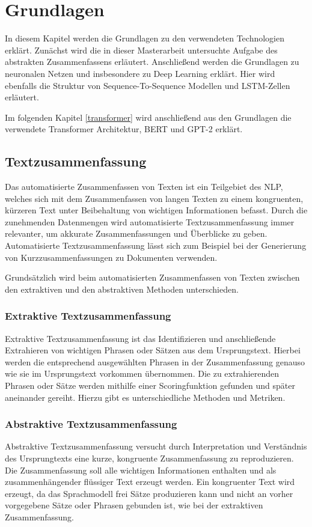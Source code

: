 \section{Grundlagen}\raggedbottom
In diesem Kapitel werden die Grundlagen zu den verwendeten Technologien erklärt. Zunächst wird die in dieser Masterarbeit untersuchte Aufgabe des abstrakten Zusammenfassens erläutert.
Anschließend werden die Grundlagen zu neuronalen Netzen und insbesondere zu Deep Learning erklärt. 
Hier wird ebenfalls die Struktur von Sequence-To-Sequence Modellen und LSTM-Zellen erläutert.

Im folgenden Kapitel \ref*{transformer} wird anschließend aus den Grundlagen die verwendete Transformer Architektur, BERT und GPT-2 erklärt.


\subsection{Textzusammenfassung}
Das automatisierte Zusammenfassen von Texten ist ein Teilgebiet des NLP, welches sich mit dem Zusammenfassen von langen Texten zu einem kongruenten, kürzeren Text unter Beibehaltung von wichtigen Informationen befasst. 
Durch die zunehmenden Datenmengen wird automatisierte Textzusammenfassung immer relevanter, um akkurate Zusammenfassungen und Überblicke zu geben.
Automatisierte Textzusammenfassung lässt sich zum Beispiel bei der Generierung von Kurzzusammenfassungen zu Dokumenten verwenden.

Grundsätzlich wird beim automatisierten Zusammenfassen von Texten zwischen den extraktiven und den abstraktiven Methoden unterschieden.

\subsubsection{Extraktive Textzusammenfassung}
Extraktive Textzusammenfassung ist das Identifizieren und anschließende Extrahieren von wichtigen Phrasen oder Sätzen aus dem Ursprungstext.
Hierbei werden die entsprechend ausgewählten Phrasen in der Zusammenfassung genauso wie sie im Ursprungstext vorkommen übernommen.
Die zu extrahierenden Phrasen oder Sätze werden mithilfe einer Scoringfunktion gefunden und später aneinander gereiht. Hierzu gibt es unterschiedliche Methoden und Metriken.

\subsubsection{Abstraktive Textzusammenfassung}
Abstraktive Textzusammenfassung versucht durch Interpretation und Verständnis des Ursprungtexts eine kurze, kongruente Zusammenfassung zu reproduzieren. 
Die Zusammenfassung soll alle wichtigen Informationen enthalten und als zusammenhängender flüssiger Text erzeugt werden. Ein kongruenter Text wird erzeugt, da das Sprachmodell frei Sätze produzieren kann und nicht an vorher vorgegebene Sätze oder Phrasen gebunden ist, wie bei der extraktiven Zusammenfassung.

